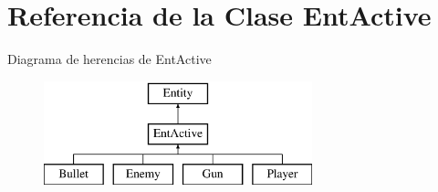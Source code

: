 \hypertarget{classEntActive}{\section{Referencia de la Clase Ent\-Active}
\label{classEntActive}
}
Diagrama de herencias de Ent\-Active\begin{figure}[H]
\begin{center}
\leavevmode
\includegraphics[height=3.000000cm]{classEntActive}
\end{center}
\end{figure}
